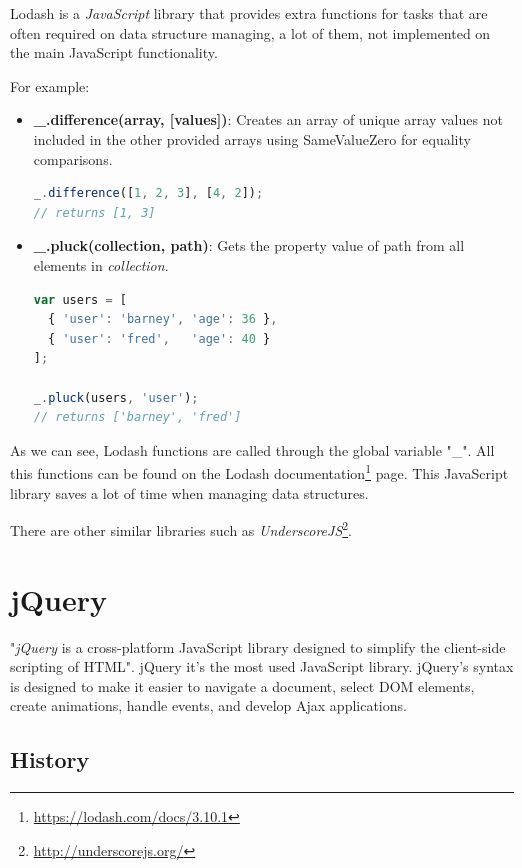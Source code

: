 \documentclass[a4paper, 12pt, english]{book}
\begin{document}
Lodash is a \textit{JavaScript} library that provides extra functions for tasks that are often required on data structure managing, a lot of them, not implemented on the main JavaScript functionality.

For example:
\begin{itemize}
    \item \textbf{\_.difference(array, [values])}: Creates an array of unique array values not included in the other provided arrays using SameValueZero for equality comparisons.
        \begin{lstlisting}[language=javascript]
_.difference([1, 2, 3], [4, 2]);
// returns [1, 3]
        \end{lstlisting}
    \item \textbf{\_.pluck(collection, path)}: Gets the property value of path from all elements in \textit{collection}.
        \begin{lstlisting}[language=javascript]
var users = [
  { 'user': 'barney', 'age': 36 },
  { 'user': 'fred',   'age': 40 }
];

_.pluck(users, 'user');
// returns ['barney', 'fred']
        \end{lstlisting}
\end{itemize}

As we can see, Lodash functions are called through the global variable "\_". All this functions can be found on the Lodash documentation\footnote{\url{https://lodash.com/docs/3.10.1}} page. This JavaScript library saves a lot of time when managing data structures.

There are other similar libraries such as \textit{UnderscoreJS}\footnote{\url{http://underscorejs.org/}}.


\section{jQuery}
\label{sec:jquery}

"\textit{jQuery} is a cross-platform JavaScript library designed to simplify the client-side scripting of HTML". jQuery it's the most used JavaScript library. jQuery's syntax is designed to make it easier to navigate a document, select DOM elements, create animations, handle events, and develop Ajax applications.

\subsection{History}
\label{sec:jquery-history}
\end{document}
